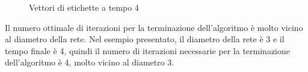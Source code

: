 \documentclass[a4paper,12pt]{report}
\begin{document}
		\begin{center}
			\begin{figure}[H]
				\centering
				\qquad
				\qquad
				\qquad

				\caption{Vettori di etichette a tempo 4}
			\end{figure}
		\end{center}

		Il numero ottimale di iterazioni per la terminazione dell'algoritmo è molto vicino al diametro della rete. Nel esempio presentato, il diametro della rete è 3 e il tempo finale è 4, quindi il numero di iterazioni necessarie per la terminazione dell'algoritmo è 4, molto vicino al diametro 3.
\end{document}
